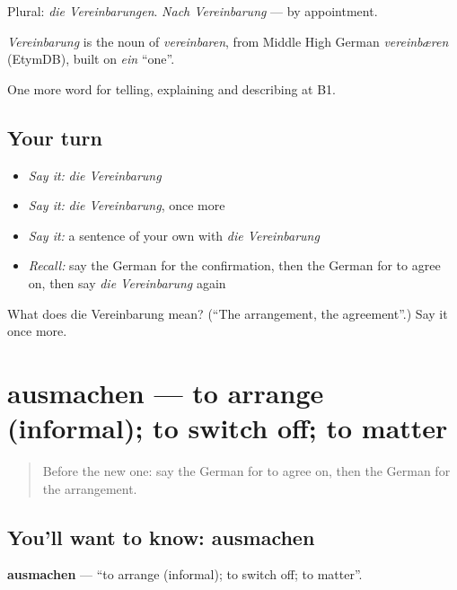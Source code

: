 Plural: \emph{die Vereinbarungen}. \emph{Nach Vereinbarung} — by appointment.

\begin{cousinweb}
\emph{Vereinbarung} is the noun of \emph{vereinbaren}, from Middle High German \emph{vereinbæren} (EtymDB), built on \emph{ein} \textquotedblleft{}one\textquotedblright{}.
\end{cousinweb}

\begin{grammarlens}[title={What you've built}]
One more word for telling, explaining and describing at B1.
\end{grammarlens}

\subsection*{Your turn}
\begin{itemize}
\raggedright
  \item \emph{Say it:} \emph{die Vereinbarung}
  \item \emph{Say it:} \emph{die Vereinbarung}, once more
  \item \emph{Say it:} a sentence of your own with \emph{die Vereinbarung}
  \item \emph{Recall:} say the German for the confirmation, then the German for to agree on, then say \emph{die Vereinbarung} again
\end{itemize}

\begin{tcolorbox}[breakable,colback=teal!4,colframe=teal!35!black,title={Before you move on}]
What does die Vereinbarung mean? (\textquotedblleft{}The arrangement, the agreement\textquotedblright{}.) Say it once more.
\end{tcolorbox}
\section[ausmachen]{ausmachen — to arrange (informal); to switch off; to matter}

\label{lesson:GE-C372-ausmachen}



\begin{quote}
Before the new one: say the German for to agree on, then the German for the arrangement.
\end{quote}

\subsection*{You'll want to know: ausmachen}
\textbf{ausmachen} — \textquotedblleft{}to arrange (informal); to switch off; to matter\textquotedblright{}.

